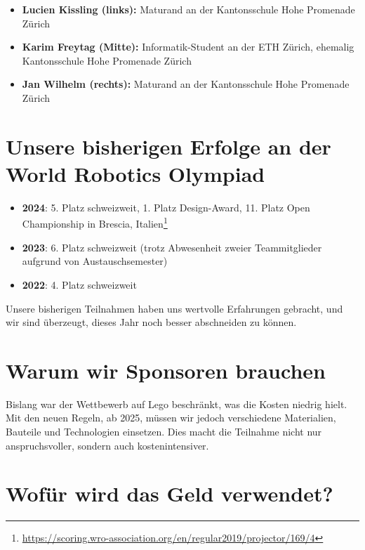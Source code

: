 \documentclass[11pt]{article}
\begin{document}
    \begin{itemize}
        \item \textbf{Lucien Kissling (links):} Maturand an der Kantonsschule Hohe Promenade Zürich
        \item \textbf{Karim Freytag (Mitte):} Informatik-Student an der ETH Zürich, ehemalig Kantonsschule Hohe Promenade Zürich
        \item \textbf{Jan Wilhelm (rechts):} Maturand an der Kantonsschule Hohe Promenade Zürich
    \end{itemize}


    \section*{Unsere bisherigen Erfolge an der World Robotics Olympiad}
    \begin{itemize}
        \item \textbf{2024}: 5.
        Platz schweizweit, 1.
        Platz Design-Award, 11.
        Platz Open Championship in Brescia, Italien\footnote{\href{https://scoring.wro-association.org/en/regular2019/projector/169/4}{https://scoring.wro-association.org/en/regular2019/projector/169/4}}
        \item \textbf{2023}: 6.
        Platz schweizweit (trotz Abwesenheit zweier Teammitglieder aufgrund von Austauschsemester)
        \item \textbf{2022}: 4.
        Platz schweizweit
    \end{itemize}

    \noindent Unsere bisherigen Teilnahmen haben uns wertvolle Erfahrungen gebracht, und wir sind überzeugt, dieses Jahr noch besser abschneiden zu können.

    \section*{Warum wir Sponsoren brauchen}

    Bislang war der Wettbewerb auf Lego beschränkt, was die Kosten niedrig hielt.
    Mit den neuen Regeln, ab 2025, müssen wir jedoch verschiedene Materialien, Bauteile und Technologien einsetzen.
    Dies macht die Teilnahme nicht nur anspruchsvoller, sondern auch kostenintensiver.

    \section*{Wofür wird das Geld verwendet?}
\end{document}
